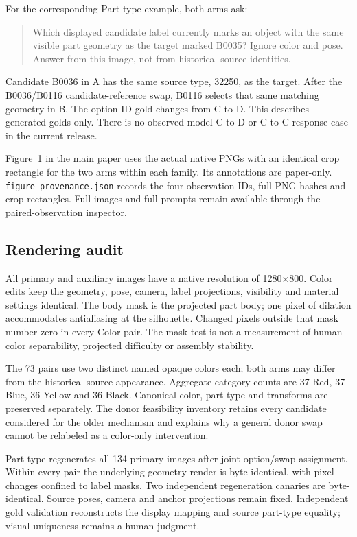 \documentclass[10pt,twocolumn,letterpaper]{article}
\begin{document}
For the corresponding Part-type example, both arms ask:
\begin{quote}\small
Which displayed candidate label currently marks an object with the
same visible part geometry as the target marked B0035? Ignore color
and pose. Answer from this image, not from historical source identities.
\end{quote}
Candidate B0036 in A has the same source type, 32250, as the target.
After the B0036/B0116 candidate-reference swap, B0116 selects that
same matching geometry in B. The option-ID gold changes from C to D.
This describes generated golds only. There is no observed model
C-to-D or C-to-C response case in the current release.

Figure~1 in the main paper uses the actual native PNGs with an identical
crop rectangle for the two arms within each family. Its annotations
are paper-only. \texttt{figure-provenance.json} records the four
observation IDs, full PNG hashes and crop rectangles. Full images and
full prompts remain available through the paired-observation inspector.

\subsection{Rendering audit}
All primary and auxiliary images have a native resolution of
1280$\times$800. Color edits keep the geometry, pose, camera, label
projections, visibility and material settings identical. The body mask
is the projected part body; one pixel of dilation accommodates
antialiasing at the silhouette. Changed pixels outside that mask
number zero in every Color pair. The mask test is not a measurement
of human color separability, projected difficulty or assembly stability.

The 73 pairs use two distinct named opaque colors each; both arms
may differ from the historical source appearance. Aggregate category
counts are 37 Red, 37 Blue, 36 Yellow and 36 Black. Canonical color,
part type and transforms are preserved separately. The donor
feasibility inventory retains every candidate considered for the older
mechanism and explains why a general donor swap cannot be relabeled
as a color-only intervention.

Part-type regenerates all 134 primary images after joint option/swap
assignment. Within every pair the underlying geometry render is
byte-identical, with pixel changes confined to label masks.
Two independent regeneration canaries are byte-identical. Source poses,
camera and anchor projections remain fixed. Independent gold validation
reconstructs the display mapping and source part-type equality;
visual uniqueness remains a human judgment.
\end{document}
